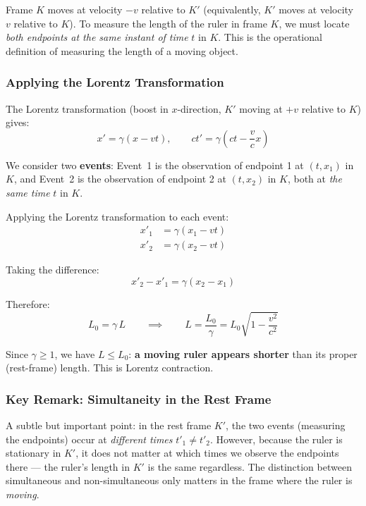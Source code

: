 Frame $K$ moves at velocity $-v$ relative to $K'$ (equivalently, $K'$ moves at velocity $v$ relative to $K$). To measure the length of the ruler in frame $K$, we must locate \emph{both endpoints at the same instant of time} $t$ in $K$. This is the operational definition of measuring the length of a moving object.

\subsubsection*{Applying the Lorentz Transformation}

The Lorentz transformation (boost in $x$-direction, $K'$ moving at $+v$ relative to $K$) gives:
\begin{equation}\label{eq:lorentz_boost_x}
    x' = \gamma(x - vt), \qquad ct' = \gamma\!\left(ct - \frac{v}{c}x\right)
\end{equation}

We consider two \textbf{events}: Event~1 is the observation of endpoint 1 at $(t, x_1)$ in $K$, and Event~2 is the observation of endpoint 2 at $(t, x_2)$ in $K$, both at \emph{the same time} $t$ in $K$.

Applying the Lorentz transformation to each event:
\begin{align*}
    x'_1 &= \gamma(x_1 - vt) \\
    x'_2 &= \gamma(x_2 - vt)
\end{align*}

Taking the difference:
\begin{equation}\label{eq:lec05:length-transform-difference}
    x'_2 - x'_1 = \gamma(x_2 - x_1)
\end{equation}

Therefore:
\begin{equation}\label{eq:lec05:length-contraction}
    L_0 = \gamma \, L
    \qquad \implies \qquad
    \boxed{L = \frac{L_0}{\gamma} = L_0\sqrt{1 - \frac{v^2}{c^2}}}
\end{equation}

Since $\gamma \geq 1$, we have $L \leq L_0$: \textbf{a moving ruler appears shorter} than its proper (rest-frame) length. This is Lorentz contraction.

\subsubsection*{Key Remark: Simultaneity in the Rest Frame}

A subtle but important point: in the rest frame $K'$, the two events (measuring the endpoints) occur at \emph{different times} $t'_1 \neq t'_2$. However, because the ruler is stationary in $K'$, it does not matter at which times we observe the endpoints there — the ruler's length in $K'$ is the same regardless. The distinction between simultaneous and non-simultaneous only matters in the frame where the ruler is \emph{moving}.


